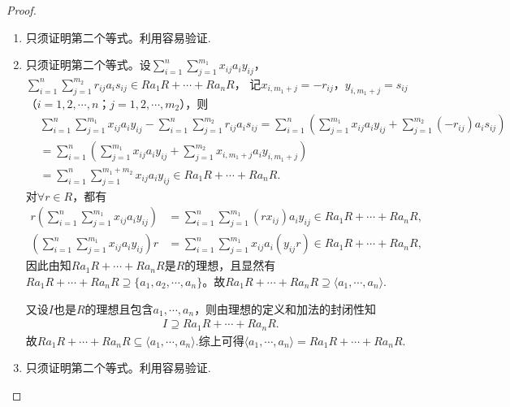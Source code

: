 \documentclass[../../main.tex]{subfiles}%
\begin{document}
\begin{proof}
\begin{enumerate}[(1)]
\item 只须证明第二个等式。利用容易验证.

\item 只须证明第二个等式。设$\sum\limits_{i=1}^n \sum\limits_{j=1}^{m_1} x_{ij}a_iy_{ij}$，$\sum\limits_{i=1}^n \sum\limits_{j=1}^{m_2} r_{ij}a_is_{ij} \in Ra_1R+\cdots+Ra_nR$，
记$x_{i,m_1+j}=-r_{ij}$，$y_{i,m_1+j}=s_{ij}$（$i=1,2,\cdots,n$；$j=1,2,\cdots,m_2$），则
\begin{align*}
&\sum\limits_{i=1}^n \sum\limits_{j=1}^{m_1} x_{ij}a_iy_{ij} - \sum\limits_{i=1}^n \sum\limits_{j=1}^{m_2} r_{ij}a_is_{ij} = \sum\limits_{i=1}^n \left( \sum\limits_{j=1}^{m_1} x_{ij}a_iy_{ij} + \sum\limits_{j=1}^{m_2} (-r_{ij})a_is_{ij} \right) \\
&= \sum\limits_{i=1}^n \left( \sum\limits_{j=1}^{m_1} x_{ij}a_iy_{ij} + \sum\limits_{j=1}^{m_2} x_{i,m_1+j}a_iy_{i,m_1+j} \right) \\
&= \sum\limits_{i=1}^n \sum\limits_{j=1}^{m_1+m_2} x_{ij}a_iy_{ij} \in Ra_1R+\cdots+Ra_nR.
\end{align*}
对$\forall r \in R$，都有
\begin{align*}
r\left( \sum\limits_{i=1}^n \sum\limits_{j=1}^{m_1} x_{ij}a_iy_{ij} \right) &= \sum\limits_{i=1}^n \sum\limits_{j=1}^{m_1} (rx_{ij})a_iy_{ij} \in Ra_1R+\cdots+Ra_nR, \\
\left( \sum\limits_{i=1}^n \sum\limits_{j=1}^{m_1} x_{ij}a_iy_{ij} \right) r &= \sum\limits_{i=1}^n \sum\limits_{j=1}^{m_1} x_{ij}a_i(y_{ij}r) \in Ra_1R+\cdots+Ra_nR,
\end{align*}
因此由知$Ra_1R+\cdots+Ra_nR$是$R$的理想，且显然有$Ra_1R+\cdots+Ra_nR \supseteq \{a_1,a_2,\cdots,a_n\}$。故$Ra_1R+\cdots +Ra_nR\supseteq \langle a_1,\cdots ,a_n\rangle.$

又设$I$也是$R$的理想且包含$a_1,\cdots,a_n$，则由理想的定义和加法的封闭性知
\begin{align*}
I \supseteq Ra_1R+\cdots+Ra_nR.
\end{align*}
故$Ra_1R+\cdots +Ra_nR\subseteq \langle a_1,\cdots ,a_n\rangle.$综上可得$\langle a_1,\cdots,a_n \rangle = Ra_1R+\cdots+Ra_nR$.

\item 只须证明第二个等式。利用容易验证.


\end{enumerate}
\end{proof}
\end{document}
